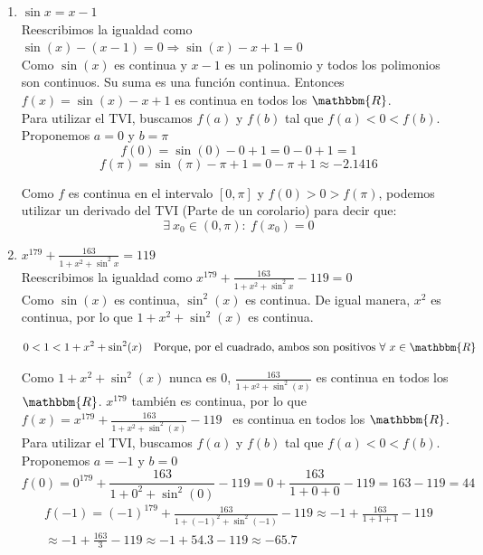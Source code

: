 \documentclass[12pt]{article}
\begin{document}
\begin{enumerate}[\hspace{9px} a)]
    \item \(\sin x = x-1\)\\

        Reescribimos la igualdad como \(\sin(x)-(x-1)=0 \Longrightarrow \sin(x)-x+1=0\)\\

        Como $\sin(x)$ es continua y $x-1$ es un polinomio y todos los polimonios son continuos. Su suma es una función continua. Entonces \(f(x)=\sin(x)-x+1\) es continua en todos los $\mathbbm{R}$.\\

        Para utilizar el TVI, buscamos $f(a)$ y $f(b)$ tal que $f(a)<0<f(b)$.\\

        Proponemos $a=0$ y $b=\pi$
        \[f(0)=\sin(0)-0+1=0-0+1=1\]
        \[f(\pi)=\sin(\pi)-\pi+1=0-\pi+1 \approx -2.1416\]

        Como $f$ es continua en el intervalo $[0,\pi]$ y \(f(0)>0>f(\pi)\), podemos utilizar un derivado del TVI (Parte de un corolario) para decir que: \[\exists \ x_0 \in (0,\pi) : \ f(x_0)=0\]

    \item \(x^{179}+\displaystyle\frac{163}{1+x^2+\sin^2 x}=119\)\\

        Reescribimos la igualdad como \(x^{179}+\displaystyle\frac{163}{1+x^2+\sin^2 x}-119=0\)\\

        Como $\sin(x)$ es continua, $\sin^2(x)$ es continua. De igual manera, $x^2$ es continua, por lo que $1+x^2+\sin^2(x)$ es continua.

        \[0<1<1+x^2+\sin^2(x) \quad \text{Porque, por el cuadrado, ambos son positivos $\forall \ x \in \mathbbm{R}$}\]

        Como $1+x^2+\sin^2(x)$ nunca es 0, $\displaystyle\frac{163}{1+x^2+\sin^2(x)}$ es continua en todos los $\mathbbm{R}$. $x^{179}$ también es continua, por lo que \(f(x)=x^{179}+\displaystyle\frac{163}{1+x^2+\sin^2(x)}-119\) \ es continua en todos los $\mathbbm{R}$.\\

        Para utilizar el TVI, buscamos $f(a)$ y $f(b)$ tal que $f(a)<0<f(b)$.\\

        Proponemos $a=-1$ y $b=0$
        \[f(0)=0^{179}+\displaystyle\frac{163}{1+0^2+\sin^2(0)}-119 = 0+\displaystyle\frac{163}{1+0+0}-119 = 163-119 = 44\]
        \begin{multline*}
            f(-1)=(-1)^{179}+\displaystyle\frac{163}{1+(-1)^2+\sin^2(-1)}-119 \approx -1+\displaystyle\frac{163}{1+1+1}-119 \\ \approx -1+\displaystyle\frac{163}{3}-119 \approx -1+54.3-119 \approx -65.7
        \end{multline*}


\end{enumerate}
\end{document}
